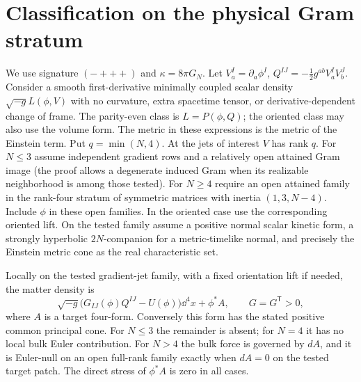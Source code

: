 \section{Classification on the physical Gram stratum}\label{sec:cone}

We use signature \((-+++)\) and \(\kappa=8\pi G_N\). Let \(V_a^I=\partial_a\phi^I\), \(Q^{IJ}=-\tfrac12g^{ab}V_a^IV_b^J\). Consider a smooth first-derivative minimally coupled scalar density \(\sqrt{-g}L(\phi,V)\) with no curvature, extra spacetime tensor, or derivative-dependent change of frame. The parity-even class is \(L=P(\phi,Q)\); the oriented class may also use the volume form. The metric in these expressions is the metric of the Einstein term. Put \(q=\min(N,4)\). At the jets of interest \(V\) has rank \(q\). For \(N\le3\) assume independent gradient rows and a relatively open attained Gram image (the proof allows a degenerate induced Gram when its realizable neighborhood is among those tested). For \(N\ge4\) require an open attained family in the rank-four stratum of symmetric matrices with inertia \((1,3,N-4)\). Include \(\phi\) in these open families. In the oriented case use the corresponding oriented lift. On the tested family assume a positive normal scalar kinetic form, a strongly hyperbolic \(2N\)-companion for a metric-timelike normal, and precisely the Einstein metric cone as the real characteristic set.

\begin{theorem}\label{thm:cone}
Locally on the tested gradient-jet family, with a fixed orientation lift if needed, the matter density is
\begin{equation}\label{eq:form}
 \sqrt{-g}\bigl(G_{IJ}(\phi)Q^{IJ}-U(\phi)\bigr)\dd^4x+\phi^*A ,
 \qquad G=G^{\mathsf T}>0 ,
\end{equation}
where \(A\) is a target four-form. Conversely this form has the stated positive common principal cone. For \(N\le3\) the remainder is absent; for \(N=4\) it has no local bulk Euler contribution. For \(N>4\) the bulk force is governed by \(dA\), and it is Euler-null on an open full-rank family exactly when \(dA=0\) on the tested target patch. The direct stress of \(\phi^*A\) is zero in all cases.
\end{theorem}

